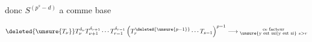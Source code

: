 donc $S^{(p^s-d)}$ a comme base

\[
\deleted{\unsure{T_\nu}}T_\nu^{\delta_\nu}T_{\nu+1}^{\delta_{\nu+1}}\cdots T_{r-1}^{\delta_{r-1}}
\left(T_r^{\deleted{\unsure{p-1}}}\cdots T_{s-1}\right)^{p-1}
\longrightarrow\substack{\text{ce facteur}\\\text{\unsure{y est ssi|y est si} }s>r}
\]

